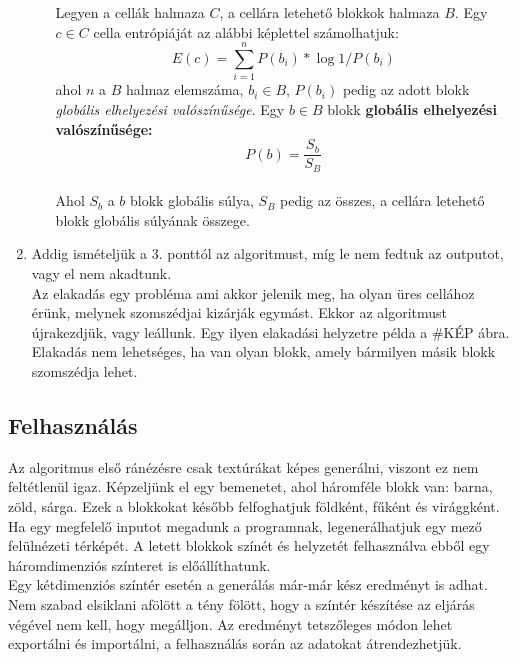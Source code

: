 \begin{enumerate}
\begin{itemize}
        Legyen a cellák halmaza $C$, a cellára letehető blokkok halmaza $B$. Egy $c\in C$ cella entrópiáját az alábbi képlettel számolhatjuk: $$E(c) = \sum_{i=1}^{n}P(b_i) * \log{1/P(b_i)}$$ ahol $n$ a $B$ halmaz elemszáma, $b_i\in B$, $P(b_i)$ pedig az adott blokk \textit{globális elhelyezési valószínűsége}. Egy $b\in B$ blokk \textbf{globális elhelyezési valószínűsége:} $$P(b) = \frac{S_b}{S_B}$$\\
        Ahol $S_b$ a $b$ blokk globális súlya, $S_B$ pedig az összes, a cellára letehető blokk globális súlyának összege.
    \end{itemize}
    \item Addig ismételjük a 3. ponttól az algoritmust, míg le nem fedtuk az outputot, vagy el nem akadtunk.\\
    Az elakadás egy probléma ami akkor jelenik meg, ha olyan üres cellához érünk, melynek szomszédjai kizárják egymást. Ekkor az algoritmust újrakezdjük, vagy leállunk. Egy ilyen elakadási helyzetre példa a \#KÉP ábra.\\
    Elakadás nem lehetséges, ha van olyan blokk, amely bármilyen másik blokk szomszédja lehet.
\end{enumerate}

\newpage

\subsection{Felhasználás}
Az algoritmus első ránézésre csak textúrákat képes generálni, viszont ez nem feltétlenül igaz. Képzeljünk el egy bemenetet, ahol háromféle blokk van: barna, zöld, sárga. Ezek a blokkokat később felfoghatjuk földként, fűként és virággként. Ha egy megfelelő inputot megadunk a programnak, legenerálhatjuk egy mező felülnézeti térképét. A letett blokkok színét és helyzetét felhasználva ebből egy háromdimenziós színteret is előállíthatunk.\\
Egy kétdimenziós színtér esetén a generálás már-már kész eredményt is adhat. Nem szabad elsiklani afölött a tény fölött, hogy a színtér készítése az eljárás végével nem kell, hogy megálljon. Az eredményt tetszőleges módon lehet exportálni és importálni, a felhasználás során az adatokat átrendezhetjük.
